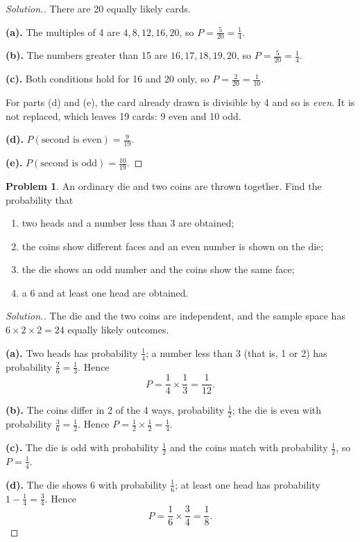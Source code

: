 \documentclass[12pt,a4paper]{report}
\theoremstyle{definition}
\theoremstyle{plain}
\theoremstyle{definition}
\newtheorem{problemx}{Problem}[section]
\newenvironment{problem}{\begin{problemx}}{\end{problemx}}
\newenvironment{solution}
  {\renewcommand{\qedsymbol}{}\begin{proof}[\textit{Solution}.]}
  {\end{proof}}
\begin{document}
\begin{solution}
There are 20 equally likely cards.

\textbf{(a).} The multiples of 4 are $4, 8, 12, 16, 20$, so
$P = \frac{5}{20} = \frac{1}{4}$.

\textbf{(b).} The numbers greater than 15 are $16, 17, 18, 19, 20$, so
$P = \frac{5}{20} = \frac{1}{4}$.

\textbf{(c).} Both conditions hold for 16 and 20 only, so
$P = \frac{2}{20} = \frac{1}{10}$.

For parts (d) and (e), the card already drawn is divisible by 4 and so is
\emph{even}. It is not replaced, which leaves 19 cards: 9 even and 10 odd.

\textbf{(d).} $P(\text{second is even}) = \frac{9}{19}$.

\textbf{(e).} $P(\text{second is odd}) = \frac{10}{19}$.
\end{solution}

\begin{problem}
An ordinary die and two coins are thrown together. Find the probability that
\begin{enumerate}
\item[(a).] two heads and a number less than 3 are obtained;
\item[(b).] the coins show different faces and an even number is shown on the die;
\item[(c).] the die shows an odd number and the coins show the same face;
\item[(d).] a 6 and at least one head are obtained.
\end{enumerate}
\end{problem}

\begin{solution}
The die and the two coins are independent, and the sample space has
$6\times 2\times 2 = 24$ equally likely outcomes.

\textbf{(a).} Two heads has probability $\tfrac14$; a number less than 3 (that is, 1 or
2) has probability $\tfrac26=\tfrac13$. Hence
\[P = \frac{1}{4}\times\frac{1}{3} = \frac{1}{12}.\]

\textbf{(b).} The coins differ in 2 of the 4 ways, probability $\tfrac12$; the die is
even with probability $\tfrac36=\tfrac12$. Hence $P = \tfrac12\times\tfrac12=\tfrac14$.

\textbf{(c).} The die is odd with probability $\tfrac12$ and the coins match with
probability $\tfrac12$, so $P = \tfrac14$.

\textbf{(d).} The die shows 6 with probability $\tfrac16$; at least one head has
probability $1-\tfrac14 = \tfrac34$. Hence
\[P = \frac{1}{6}\times\frac{3}{4} = \frac{1}{8}.\]
\end{solution}
\end{document}
